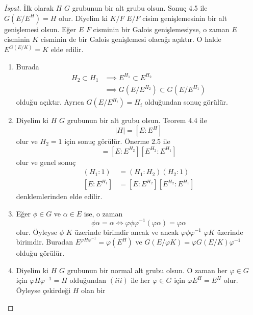 \documentclass[draft]{article}
\theoremstyle{definition}
\theoremstyle{remark}
\newcommand{\envert}[1]{\left\lvert#1\right\rvert}
\let\abs=\envert
\begin{document}
    	    \begin{proof}[İspat]
    	        İlk olarak $H$ $G$ grubunun bir alt grubu olsun. Sonuç 4.5 ile $G(E/E^H) = H$ olur. Diyelim ki $K/F$ $E/F$ cisim genişlemesinin bir alt genişlemesi olsun. Eğer $E$ $F$ cisminin bir Galois genişlemesiyse, o zaman $E$ cisminin $K$ cisminin de bir Galois genişlemesi olacağı açıktır. O halde $E^{G(E/K)} = K$ elde edilir.
    	        \begin{enumerate}
    				\renewcommand{\labelenumi}{(\roman{enumi})}
    				\item Burada
    				\begin{align*}
    				    H_2 \subset H_1 &\implies E^{H_1} \subset E^{H_2}\\
    				    &\implies G(E/E^{H_2}) \subset G(E/E^{H_1})
    				\end{align*}
    				olduğu açıktır. Ayrıca $G(E/E^{H_i}) = H_i$ olduğundan sonuç görülür.
    				\item Diyelim ki $H$ $G$ grubunun bir alt grubu olsun. Teorem 4.4 ile
    				\begin{equation*}
    				    \abs{H} = [E : E^H]
    				\end{equation*}
    			    olur ve $H_2 = 1$ için sonuç görülür. Önerme 2.5 ile
    			    \begin{equation*}
    			        [E : E^{H_1}] = [E : E^{H_2}][E^{H_2} : E^{H_1}]
    			    \end{equation*}
    			    olur ve genel sonuç
    			    \begin{align*}
    			        (H_1 : 1) &= (H_1 : H_2)(H_2 : 1)\\
    			        [E : E^{H_1}] &= [E : E^{H_2}][E^{H_2} : E^{H_1}]
    			    \end{align*}
    			    denklemlerinden elde edilir.
    			    \item Eğer $\phi \in G$ ve $\alpha \in E$ ise, o zaman
    			    \begin{equation*}
    			        \phi \alpha = \alpha \iff \varphi \phi \varphi^{-1}(\varphi \alpha) = \varphi \alpha
    			    \end{equation*}
    			    olur. Öyleyse $\phi$ $K$ üzerinde birimdir ancak ve ancak $\varphi \phi \varphi^{-1}$ $\varphi K$ üzerinde birimdir. Buradan $E^{\varphi H \varphi^{-1}} = \varphi(E^H)$ ve $G(E/\varphi K) = \varphi G(E/K) \varphi^{-1}$ olduğu görülür.
    			    \item Diyelim ki $H$ $G$ grubunun bir normal alt grubu olsun. O zaman her $\varphi \in G$ için $\varphi H \varphi^{-1} = H$ olduğundan $(iii)$ ile her $\varphi \in G$ için $\varphi E^H = E^H$ olur. Öyleyse çekirdeği $H$ olan bir

\end{enumerate}
\end{proof}
\end{document}
